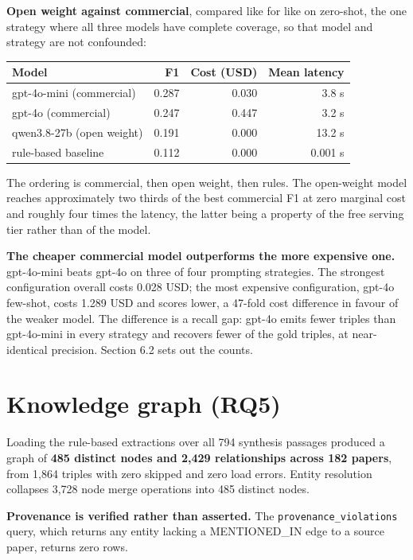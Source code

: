 \documentclass[11pt,a4paper,oneside]{report}
\begin{document}
\textbf{Open weight against commercial}, compared like for like on zero-shot, the one strategy where all three models have complete coverage, so that model and strategy are not confounded:

\par\medskip
\begingroup
\small\setlength{\tabcolsep}{6pt}
\begin{tabular}{@{}lrrr@{}}
\toprule
\textbf{Model} & \textbf{F1} & \textbf{Cost (USD)} & \textbf{Mean latency} \\
\midrule
gpt-4o-mini (commercial) & 0.287 & 0.030 & 3.8 s \\
gpt-4o (commercial) & 0.247 & 0.447 & 3.2 s \\
qwen3.8-27b (open weight) & 0.191 & 0.000 & 13.2 s \\
rule-based baseline & 0.112 & 0.000 & 0.001 s \\
\bottomrule
\end{tabular}
\endgroup
\par\medskip
The ordering is commercial, then open weight, then rules. The open-weight model reaches approximately two thirds of the best commercial F1 at zero marginal cost and roughly four times the latency, the latter being a property of the free serving tier rather than of the model.

\textbf{The cheaper commercial model outperforms the more expensive one.} gpt-4o-mini beats gpt-4o on three of four prompting strategies. The strongest configuration overall costs 0.028 USD; the most expensive configuration, gpt-4o few-shot, costs 1.289 USD and scores lower, a 47-fold cost difference in favour of the weaker model. The difference is a recall gap: gpt-4o emits fewer triples than gpt-4o-mini in every strategy and recovers fewer of the gold triples, at near-identical precision. Section 6.2 sets out the counts.

\section{Knowledge graph (RQ5)}

Loading the rule-based extractions over all 794 synthesis passages produced a graph of \textbf{485 distinct nodes and 2,429 relationships across 182 papers}, from 1,864 triples with zero skipped and zero load errors. Entity resolution collapses 3,728 node merge operations into 485 distinct nodes.

\textbf{Provenance is verified rather than asserted.} The \texttt{provenance\_\allowbreak{}violations} query, which returns any entity lacking a MENTIONED\_IN edge to a source paper, returns zero rows.
\end{document}
